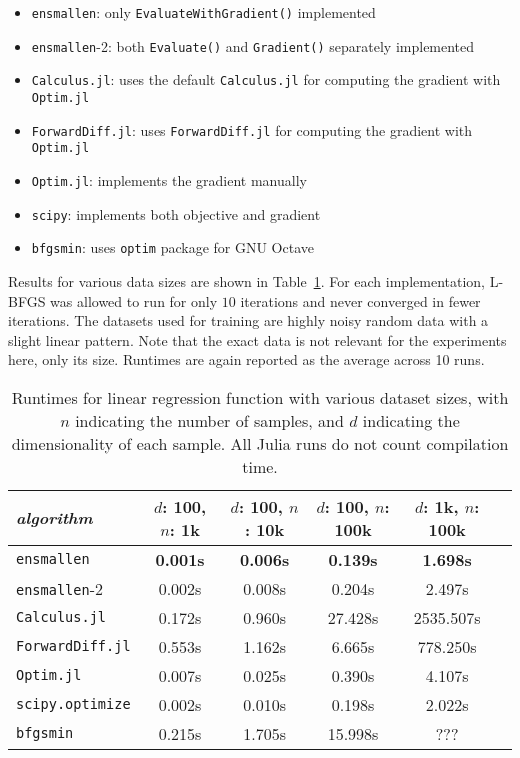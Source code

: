 \documentclass{article}
\begin{document}
\vspace*{-0.3em}
\begin{itemize} \itemsep -1pt
  \item {\tt ensmallen}: only {\tt EvaluateWithGradient()} implemented
  \item {\tt ensmallen}-2: both {\tt Evaluate()} and {\tt Gradient()} separately
implemented
  \item {\tt Calculus.jl}: uses the default {\tt Calculus.jl} for
computing the gradient with {\tt Optim.jl}
  \item {\tt ForwardDiff.jl}: uses {\tt ForwardDiff.jl} for computing
the gradient with {\tt Optim.jl}
  \item {\tt Optim.jl}: implements the gradient manually
  \item {\tt scipy}: implements both objective and
gradient
  \item {\tt bfgsmin}: uses {\tt optim} package for GNU Octave
\end{itemize}
\vspace*{-0.3em}

Results for various data sizes are shown in Table~\ref{tab:lbfgs}.  For each
implementation, L-BFGS was allowed to run for only $10$ iterations and never
converged in fewer iterations.  The datasets used for training are highly noisy random
data with a slight linear pattern. Note that the exact data is not relevant
for the experiments here, only its size.  Runtimes are again reported as the
average across 10 runs.

\begin{table}
\begin{center}
\begin{tabular}{lccccc}
\toprule
{\em algorithm} & $d$: 100, $n$: 1k & $d$: 100, $n$: 10k & $d$: 100, $n$:
100k & $d$: 1k, $n$: 100k \\
\midrule
{\tt ensmallen} & {\bf 0.001s} & {\bf 0.006s} & {\bf 0.139s} & {\bf 1.698s} \\
{\tt ensmallen}-2 & 0.002s & 0.008s & 0.204s & 2.497s \\
{\tt Calculus.jl} & 0.172s & 0.960s & 27.428s & 2535.507s \\
{\tt ForwardDiff.jl} & 0.553s & 1.162s & 6.665s & 778.250s \\
{\tt Optim.jl} & 0.007s & 0.025s & 0.390s & 4.107s \\
{\tt scipy.optimize} & 0.002s & 0.010s & 0.198s & 2.022s \\
{\tt bfgsmin} & 0.215s & 1.705s & 15.998s & ??? \\
\bottomrule
\end{tabular}
\end{center}
\caption{Runtimes for linear regression function with various dataset sizes,
with $n$ indicating the number of samples,
and $d$ indicating the dimensionality of each sample.
All Julia runs do not count compilation time.}
\label{tab:lbfgs}
\end{table}
\end{document}

